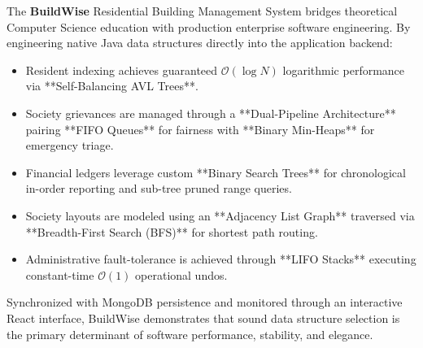\documentclass[12pt,a4paper]{article}
\begin{document}
The \textbf{BuildWise} Residential Building Management System bridges theoretical Computer Science education with production enterprise software engineering. By engineering native Java data structures directly into the application backend:
\begin{itemize}[leftmargin=1.5em]
    \item Resident indexing achieves guaranteed $\mathcal{O}(\log N)$ logarithmic performance via **Self-Balancing AVL Trees**.
    \item Society grievances are managed through a **Dual-Pipeline Architecture** pairing **FIFO Queues** for fairness with **Binary Min-Heaps** for emergency triage.
    \item Financial ledgers leverage custom **Binary Search Trees** for chronological in-order reporting and sub-tree pruned range queries.
    \item Society layouts are modeled using an **Adjacency List Graph** traversed via **Breadth-First Search (BFS)** for shortest path routing.
    \item Administrative fault-tolerance is achieved through **LIFO Stacks** executing constant-time $\mathcal{O}(1)$ operational undos.
\end{itemize}
Synchronized with MongoDB persistence and monitored through an interactive React interface, BuildWise demonstrates that sound data structure selection is the primary determinant of software performance, stability, and elegance.
\end{document}
